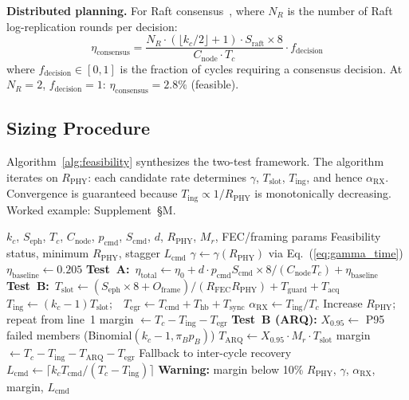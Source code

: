 \documentclass[journal]{IEEEtran}
\begin{document}
\textbf{Distributed planning.} For Raft consensus~\cite{ongaro_raft}, where $N_R$ is the number of Raft log-replication rounds per decision:
\begin{equation}
    \eta_{\text{consensus}} = \frac{N_R \cdot (\lfloor k_c/2 \rfloor + 1) \cdot S_{\text{raft}} \times 8}{C_{\text{node}} \cdot T_c} \cdot f_{\text{decision}}
    \label{eq:eta_consensus}
\end{equation}
where $f_{\text{decision}} \in [0,1]$ is the fraction of cycles requiring a consensus decision. At $N_R = 2$, $f_{\text{decision}} = 1$: $\eta_{\text{consensus}} = 2.8\%$ (feasible).

\subsection{Sizing Procedure}

Algorithm~\ref{alg:feasibility} synthesizes the two-test framework. The algorithm iterates on $R_{\text{PHY}}$: each candidate rate determines $\gamma$, $T_{\text{slot}}$, $T_{\text{ing}}$, and hence $\alpha_{\text{RX}}$. Convergence is guaranteed because $T_{\text{ing}} \propto 1/R_{\text{PHY}}$ is monotonically decreasing. Worked example: Supplement~\S M.

\begin{algorithm}[t]
\caption{Coordination Feasibility Test}
\label{alg:feasibility}
\begin{algorithmic}[1]
\REQUIRE $k_c$, $S_{\text{eph}}$, $T_c$, $C_{\text{node}}$, $p_{\text{cmd}}$, $S_{\text{cmd}}$, $d$, $R_{\text{PHY}}$, $M_r$, FEC/framing params
\ENSURE Feasibility status, minimum $R_{\text{PHY}}$, stagger $L_{\text{cmd}}$
\STATE $\gamma \leftarrow \gamma(R_{\text{PHY}})$ via Eq.~(\ref{eq:gamma_time})
\STATE $\eta_{\text{baseline}} \leftarrow 0.205$
\STATE \textbf{Test~A:}~$\eta_{\text{total}} \leftarrow \eta_0 + d \cdot p_{\text{cmd}} S_{\text{cmd}} \times 8 / (C_{\text{node}} T_c) + \eta_{\text{baseline}}$
\STATE \textbf{Test~B:}~$T_{\text{slot}} \leftarrow (S_{\text{eph}} \times 8 + O_{\text{frame}}) / (R_{\text{FEC}} R_{\text{PHY}}) + T_{\text{guard}} + T_{\text{acq}}$
\STATE $T_{\text{ing}} \leftarrow (k_c - 1) T_{\text{slot}}$;~~$T_{\text{egr}} \leftarrow T_{\text{cmd}} + T_{\text{hb}} + T_{\text{sync}}$
\STATE $\alpha_{\text{RX}} \leftarrow T_{\text{ing}} / T_c$
    \STATE Increase $R_{\text{PHY}}$; repeat from line~1
\ENDIF
\STATE margin $\leftarrow T_c - T_{\text{ing}} - T_{\text{egr}}$
\STATE \textbf{Test~B (ARQ):} $X_{0.95} \leftarrow$ P95 failed members (Binomial$(k_c{-}1, \pi_B p_B)$)
\STATE $T_{\text{ARQ}} \leftarrow X_{0.95} \cdot M_r \cdot T_{\text{slot}}$ 
    \STATE margin $\leftarrow T_c - T_{\text{ing}} - T_{\text{ARQ}} - T_{\text{egr}}$
    \STATE Fallback to inter-cycle recovery
\ENDIF
\STATE $L_{\text{cmd}} \leftarrow \lceil k_c T_{\text{cmd}} / (T_c - T_{\text{ing}}) \rceil$
    \STATE \textbf{Warning:} margin below 10\%
\ENDIF
\RETURN $R_{\text{PHY}}$, $\gamma$, $\alpha_{\text{RX}}$, margin, $L_{\text{cmd}}$
\end{algorithmic}
\end{algorithm}
\end{document}
